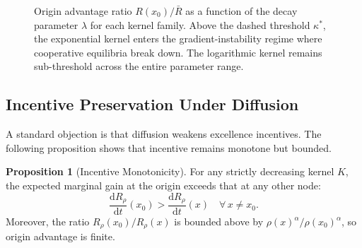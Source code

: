 \documentclass[12pt,a4paper]{article}
\theoremstyle{definition}
\newtheorem{proposition}{Proposition}[section]
\newcommand{\ddt}[1]{\frac{\mathrm{d}#1}{\mathrm{d}t}}
\begin{document}
\begin{figure}[ht]
\centering
{}
\caption{Origin advantage ratio $R(x_0)/\bar{R}$ as a function of the decay
  parameter $\lambda$ for each kernel family.  Above the dashed threshold
  $\kappa^*$, the exponential kernel enters the gradient-instability regime
  where cooperative equilibria break down.  The logarithmic kernel remains
  sub-threshold across the entire parameter range.}
\label{fig:threshold}
\end{figure}

\subsection{Incentive Preservation Under Diffusion}

A standard objection is that diffusion weakens excellence incentives.  The
following proposition shows that incentive remains monotone but bounded.

\begin{proposition}[Incentive Monotonicity]
  For any strictly decreasing kernel $K$, the expected marginal gain at the
  origin exceeds that at any other node:
  \begin{equation}
    \ddt{R_\rho}(x_0) > \ddt{R_\rho}(x) \quad \forall\, x \neq x_0.
  \end{equation}
  Moreover, the ratio $R_\rho(x_0)/R_\rho(x)$ is bounded above by
  $\rho(x)^\alpha / \rho(x_0)^\alpha$, so origin advantage is finite.
\end{proposition}
\end{document}
